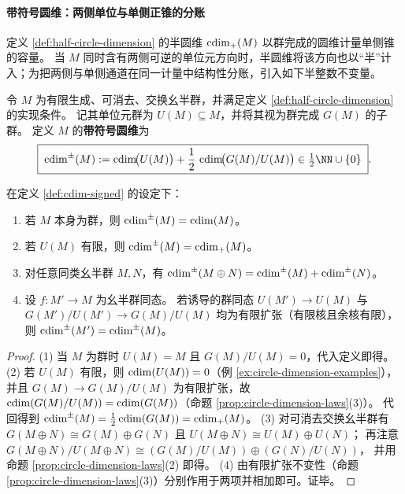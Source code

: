 \paragraph{带符号圆维：两侧单位与单侧正锥的分账}\label{para:cdim-signed-circle-dimension}
定义 \ref{def:half-circle-dimension} 的半圆维 \(\operatorname{cdim}_{+}(M)\) 以群完成的圆维计量单侧锥的容量。
当 \(M\) 同时含有两侧可逆的单位元方向时，半圆维将该方向也以“半”计入；为把两侧与单侧通道在同一计量中结构性分账，引入如下半整数不变量。

\begin{definition}[带符号圆维]\label{def:cdim-signed}
令 \(M\) 为有限生成、可消去、交换幺半群，并满足定义 \ref{def:half-circle-dimension} 的实现条件。
记其单位元群为 \(U(M)\subseteq M\)，并将其视为群完成 \(G(M)\) 的子群。
定义 \(M\) 的\textbf{带符号圆维}为
\[
\boxed{\;
\cdim^{\pm}(M):=\cdim\!\bigl(U(M)\bigr)+\frac12\,\cdim\!\bigl(G(M)/U(M)\bigr)
\in\tfrac12\NN\cup\{0\}\; } .
\]
\end{definition}

\begin{proposition}[带符号圆维的延拓与稳定性]\label{prop:cdim-signed-laws}
在定义 \ref{def:cdim-signed} 的设定下：
\begin{enumerate}
  \item 若 \(M\) 本身为群，则 \(\operatorname{cdim}^{\pm}(M)=\operatorname{cdim}(M)\)。
  \item 若 \(U(M)\) 有限，则 \(\operatorname{cdim}^{\pm}(M)=\operatorname{cdim}_{+}(M)\)。
  \item 对任意同类幺半群 \(M,N\)，有 \(\operatorname{cdim}^{\pm}(M\oplus N)=\operatorname{cdim}^{\pm}(M)+\operatorname{cdim}^{\pm}(N)\)。
  \item 设 \(f:M'\to M\) 为幺半群同态。
        若诱导的群同态 \(U(M')\to U(M)\) 与 \(G(M')/U(M')\to G(M)/U(M)\) 均为有限扩张（有限核且余核有限），
        则 \(\operatorname{cdim}^{\pm}(M')=\operatorname{cdim}^{\pm}(M)\)。
\end{enumerate}
\end{proposition}
\begin{proof}
(1) 当 \(M\) 为群时 \(U(M)=M\) 且 \(G(M)/U(M)=0\)，代入定义即得。
(2) 若 \(U(M)\) 有限，则 \(\operatorname{cdim}(U(M))=0\)（例 \ref{ex:circle-dimension-examples}），并且 \(G(M)\to G(M)/U(M)\) 为有限扩张，故 \(\operatorname{cdim}(G(M)/U(M))=\operatorname{cdim}(G(M))\)（命题 \ref{prop:circle-dimension-laws}(3)）。
代回得到 \(\operatorname{cdim}^{\pm}(M)=\frac12\operatorname{cdim}(G(M))=\operatorname{cdim}_{+}(M)\)。
(3) 对可消去交换幺半群有 \(G(M\oplus N)\cong G(M)\oplus G(N)\) 且 \(U(M\oplus N)\cong U(M)\oplus U(N)\)；
再注意
\(
G(M\oplus N)/U(M\oplus N)\cong (G(M)/U(M))\oplus (G(N)/U(N))
\)，
并用命题 \ref{prop:circle-dimension-laws}(2) 即得。
(4) 由有限扩张不变性（命题 \ref{prop:circle-dimension-laws}(3)）分别作用于两项并相加即可。证毕。
\end{proof}

